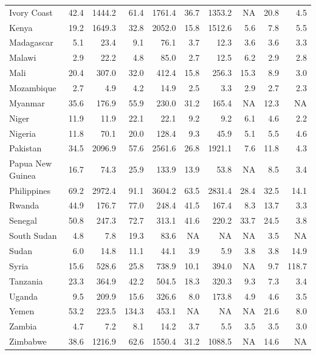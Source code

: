 \begin{table}[h]
{\begin{tabular}[t]{lrrrrrrrrr}
Ivory Coast & 42.4 & 1444.2 & 61.4 & 1761.4 & 36.7 & 1353.2 & NA & 20.8 & 4.5\\
Kenya & 19.2 & 1649.3 & 32.8 & 2052.0 & 15.8 & 1512.6 & 5.6 & 7.8 & 5.5\\
Madagascar & 5.1 & 23.4 & 9.1 & 76.1 & 3.7 & 12.3 & 3.6 & 3.6 & 3.3\\
Malawi & 2.9 & 22.2 & 4.8 & 85.0 & 2.7 & 12.5 & 6.2 & 2.9 & 2.8\\
Mali & 20.4 & 307.0 & 32.0 & 412.4 & 15.8 & 256.3 & 15.3 & 8.9 & 3.0\\
Mozambique & 2.7 & 4.9 & 4.2 & 14.9 & 2.5 & 3.3 & 2.9 & 2.7 & 2.3\\
Myanmar & 35.6 & 176.9 & 55.9 & 230.0 & 31.2 & 165.4 & NA & 12.3 & NA\\
Niger & 11.9 & 11.9 & 22.1 & 22.1 & 9.2 & 9.2 & 6.1 & 4.6 & 2.2\\
Nigeria & 11.8 & 70.1 & 20.0 & 128.4 & 9.3 & 45.9 & 5.1 & 5.5 & 4.6\\
Pakistan & 34.5 & 2096.9 & 57.6 & 2561.6 & 26.8 & 1921.1 & 7.6 & 11.8 & 4.3\\
Papua New Guinea & 16.7 & 74.3 & 25.9 & 133.9 & 13.9 & 53.8 & NA & 8.5 & 3.4\\
Philippines & 69.2 & 2972.4 & 91.1 & 3604.2 & 63.5 & 2831.4 & 28.4 & 32.5 & 14.1\\
Rwanda & 44.9 & 176.7 & 77.0 & 248.4 & 41.5 & 167.4 & 8.3 & 13.7 & 3.3\\
Senegal & 50.8 & 247.3 & 72.7 & 313.1 & 41.6 & 220.2 & 33.7 & 24.5 & 3.8\\
South Sudan & 4.8 & 7.8 & 19.3 & 83.6 & NA & NA & NA & 3.5 & NA\\
Sudan & 6.0 & 14.8 & 11.1 & 44.1 & 3.9 & 5.9 & 3.8 & 3.8 & 14.9\\
Syria & 15.6 & 528.6 & 25.8 & 738.9 & 10.1 & 394.0 & NA & 9.7 & 118.7\\
Tanzania & 23.3 & 364.9 & 42.2 & 504.5 & 18.3 & 320.3 & 9.3 & 7.3 & 3.4\\
Uganda & 9.5 & 209.9 & 15.6 & 326.6 & 8.0 & 173.8 & 4.9 & 4.6 & 3.5\\
Yemen & 53.2 & 223.5 & 134.3 & 453.1 & NA & NA & NA & 21.6 & 8.0\\
Zambia & 4.7 & 7.2 & 8.1 & 14.2 & 3.7 & 5.5 & 3.5 & 3.5 & 3.0\\
Zimbabwe & 38.6 & 1216.9 & 62.6 & 1550.4 & 31.2 & 1088.5 & NA & 14.6 & NA\\
\bottomrule
\end{tabular}}
\end{table}